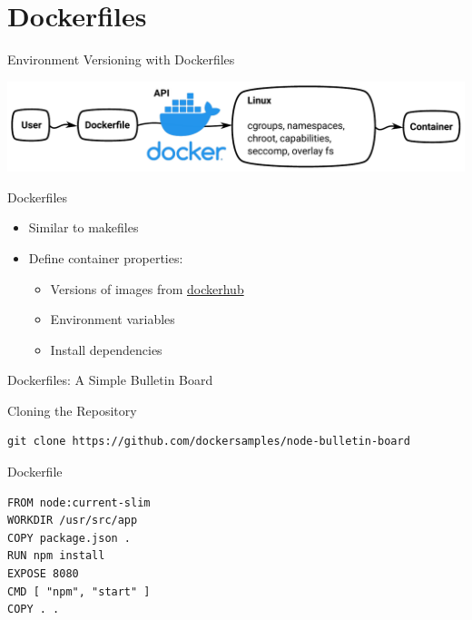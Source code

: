 \documentclass[10pt, compress, aspectratio=169, xcolor={table,usenames,dvipsnames}]{beamer}
\begin{document}
\section{Dockerfiles}
\label{sec:orgeaefe5f}
\begin{frame}[label={sec:org51b6e83}]{Environment Versioning with Dockerfiles}
\begin{center}
\includegraphics[width=.78\columnwidth]{../../img/virt_with_dockerfile.pdf}
\end{center}
\begin{block}{Dockerfiles}
\begin{itemize}
\item Similar to \alert{makefiles}
\item Define container \alert{properties}:
\begin{itemize}
\item Versions of images from \href{https://hub.docker.com/search?q=\&type=image}{dockerhub}
\item Environment variables
\item Install dependencies
\end{itemize}
\end{itemize}
\end{block}
\end{frame}
\begin{frame}[label={sec:org698a760},fragile]{Dockerfiles: A Simple Bulletin Board}
 \begin{block}{Cloning the Repository}
\lstset{language=bash,label= ,caption= ,captionpos=b,numbers=none}
\begin{lstlisting}
git clone https://github.com/dockersamples/node-bulletin-board
\end{lstlisting}
\end{block}
\begin{block}{Dockerfile}
\lstset{language=dockerfile,label= ,caption= ,captionpos=b,numbers=none}
\begin{lstlisting}
FROM node:current-slim
WORKDIR /usr/src/app
COPY package.json .
RUN npm install
EXPOSE 8080
CMD [ "npm", "start" ]
COPY . .
\end{lstlisting}
\end{block}
\end{frame}
\end{document}
